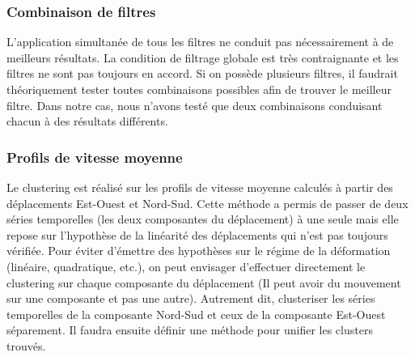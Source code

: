 \documentclass[11pt, openany]{report}
\begin{document}
\subsubsection{Combinaison de filtres}
L'application simultanée de tous les filtres ne conduit pas nécessairement à de meilleurs résultats. La  condition de filtrage globale est très contraignante et les filtres ne sont pas toujours en accord. Si on possède plusieurs filtres, il faudrait théoriquement tester toutes combinaisons possibles afin de trouver le meilleur filtre. Dans notre cas, nous n'avons testé que deux combinaisons conduisant chacun à des résultats différents.
    
\subsubsection{Profils de vitesse moyenne}
Le clustering est réalisé sur les profils de vitesse moyenne calculés à partir des déplacements Est-Ouest et Nord-Sud. Cette méthode a permis de passer de deux séries temporelles (les deux composantes du déplacement) à une seule mais elle repose sur l'hypothèse de la linéarité des déplacements qui n'est pas toujours vérifiée. Pour éviter d'émettre des hypothèses sur le régime de la déformation (linéaire, quadratique, etc.), on peut envisager d'effectuer directement le clustering sur chaque composante du déplacement (Il peut avoir du mouvement sur une composante et pas une autre). Autrement dit, clusteriser les séries temporelles de la composante Nord-Sud et ceux de la composante Est-Ouest séparement. Il faudra ensuite définir une méthode pour unifier les clusters trouvés. 
\end{document}
